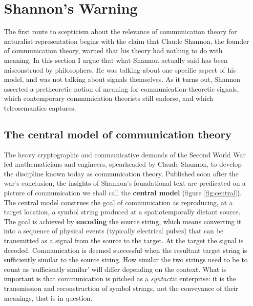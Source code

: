 
\section{Shannon's Warning}\label{sec:warning}

The first route to scepticism about the relevance of communication theory for naturalist representation begins with the claim that Claude Shannon, the founder of communication theory, warned that his theory had nothing to do with meaning.
In this section I argue that what Shannon actually said has been misconstrued by philosophers.
He was talking about one specific aspect of his model, and was not talking about signals themselves.
As it turns out, Shannon asserted a pretheoretic notion of meaning for communication-theoretic signals, which contemporary communication theorists still endorse, and which teleosemantics captures.

\subsection{The central model of communication theory}\label{subsec:central}


The heavy cryptographic and communicative demands of the Second World War led mathematicians and engineers, spearheaded by Claude Shannon, to develop the discipline known today as communication theory.
Published soon after the war's conclusion, the insights of Shannon's foundational text \parencite*{shannon1948mathematicalc} are predicated on a picture of communication we shall call the \textbf{central model} (figure \ref{fig:central}).
The central model construes the goal of communication as reproducing, at a target location, a symbol string produced at a spatiotemporally distant source.
The goal is achieved by \textbf{encoding} the source string, which means converting it into a sequence of physical events (typically electrical pulses) that can be transmitted as a signal from the source to the target.
At the target the signal is decoded.
Communication is deemed successful when the resultant target string is sufficiently similar to the source string.
How similar the two strings need to be to count as `sufficiently similar' will differ depending on the context.
What is important is that communication is pitched as a \textit{syntactic} enterprise: it is the transmission and reconstruction of symbol strings, not the conveyance of their meanings, that is in question.


